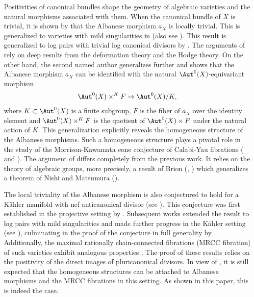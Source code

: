 \documentclass[11pt]{amsart}
\begin{document}
Positivities of canonical bundles shape the geometry of algebraic varieties and the natural morphisms associated with them. When the canonical bundle of $X$ is trivial, it is shown by \cite[Theorem 1]{Cal57} that the Albanese morphism $a_X$ is locally trivial. This is generalized to varieties with mild singularities in \cite[Theorem 8.3]{Kaw85} (also see \cite{KL09}). This result is generalized to log pairs with trivial log canonical divisors by \cite[Theorem 0.1]{Amb05}. The arguments of \cite{Kaw85, Amb05} rely on deep results from the deformation theory and the Hodge theory. On the other hand, the second named author \cite[Theorem 1.1]{Xu20} generalizes \cite[Theorem 0.1]{Amb05} further and shows that the Albanese morphism $a_X$ can be identified with the natural $\Aut^0(X)$-equivariant morphism
\[
\Aut^0(X) \times^K F \to \Aut^0(X)/K,
\] where $K\subset \Aut^0(X)$ is a finite subgroup, $F$ is the fiber of $a_X$ over the identity element and $\Aut^0(X) \times^K F$ is the quotient of $\Aut^0(X) \times F$ under the natural action of $K$. This generalization explicitly reveals the homogeneous structure of the Albanese morphisms. Such a homogeneous structure plays a pivotal role in the study of the Morrison-Kawamata cone conjecture of Calabi-Yau fibrations (\cite{Kaw97} and \cite{Li23}). The argument of \cite[Theorem 1.1]{Xu20} differs completely from the previous work. It relies on the theory of algebraic groups, more precisely, a result of Brion (\cite[Theorem 2]{Bri10}, \cite[Proposition 1.2]{Bri12}) which generalizes a theorem of Nishi and Matsumura (\cite[Theorem 2]{Mat63}).

The local triviality of the Albanese morphism is also conjectured to hold for a K\"ahler manifold with nef anticanonical divisor (see \cite{DPS96}). This conjecture was first established in the projective setting by \cite{Cao19}. Subsequent works extended the result to log pairs with mild singularities and made further progress in the K\"ahler setting (see \cite{PZ19, Wan22, EIM23}), culminating in the proof of the conjecture in full generality by \cite{MWWZ25}. Additionally, the maximal rationally chain-connected fibrations (MRCC fibration) of such varieties exhibit analogous properties \cite{CH19, MW23}. The proof of these results relies on the positivity of the direct images of pluricanonical divisors. In view of \cite{Xu20}, it is still expected that the homogeneous structures can be attached to Albanese morphisms and the MRCC fibrations in this setting. As shown in this paper, this is indeed the case. 
 
\end{document}
